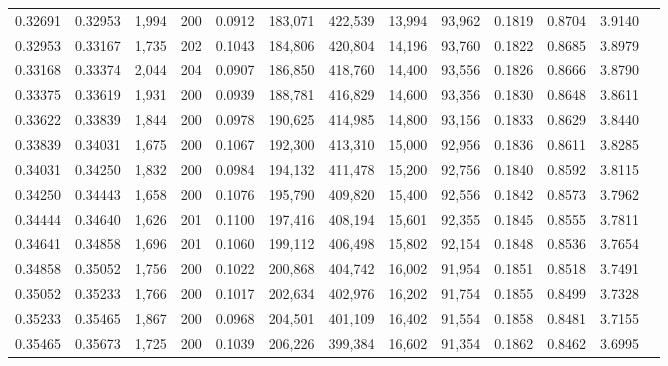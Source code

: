 \begin{tabular}{rrrrrrrrrrrrr}
0.32691 & 0.32953 & 1,994 & 200 &                                     0.0912 & 183,071 & 422,539 &  13,994 &  93,962 & 0.1819 & 0.8704 & 3.9140 \\
0.32953 & 0.33167 & 1,735 & 202 &                                     0.1043 & 184,806 & 420,804 &  14,196 &  93,760 & 0.1822 & 0.8685 & 3.8979 \\
0.33168 & 0.33374 & 2,044 & 204 &                                     0.0907 & 186,850 & 418,760 &  14,400 &  93,556 & 0.1826 & 0.8666 & 3.8790 \\
0.33375 & 0.33619 & 1,931 & 200 &                                     0.0939 & 188,781 & 416,829 &  14,600 &  93,356 & 0.1830 & 0.8648 & 3.8611 \\
0.33622 & 0.33839 & 1,844 & 200 &                                     0.0978 & 190,625 & 414,985 &  14,800 &  93,156 & 0.1833 & 0.8629 & 3.8440 \\
0.33839 & 0.34031 & 1,675 & 200 &                                     0.1067 & 192,300 & 413,310 &  15,000 &  92,956 & 0.1836 & 0.8611 & 3.8285 \\
0.34031 & 0.34250 & 1,832 & 200 &                                     0.0984 & 194,132 & 411,478 &  15,200 &  92,756 & 0.1840 & 0.8592 & 3.8115 \\
0.34250 & 0.34443 & 1,658 & 200 &                                     0.1076 & 195,790 & 409,820 &  15,400 &  92,556 & 0.1842 & 0.8573 & 3.7962 \\
0.34444 & 0.34640 & 1,626 & 201 &                                     0.1100 & 197,416 & 408,194 &  15,601 &  92,355 & 0.1845 & 0.8555 & 3.7811 \\
0.34641 & 0.34858 & 1,696 & 201 &                                     0.1060 & 199,112 & 406,498 &  15,802 &  92,154 & 0.1848 & 0.8536 & 3.7654 \\
0.34858 & 0.35052 & 1,756 & 200 &                                     0.1022 & 200,868 & 404,742 &  16,002 &  91,954 & 0.1851 & 0.8518 & 3.7491 \\
0.35052 & 0.35233 & 1,766 & 200 &                                     0.1017 & 202,634 & 402,976 &  16,202 &  91,754 & 0.1855 & 0.8499 & 3.7328 \\
0.35233 & 0.35465 & 1,867 & 200 &                                     0.0968 & 204,501 & 401,109 &  16,402 &  91,554 & 0.1858 & 0.8481 & 3.7155 \\
0.35465 & 0.35673 & 1,725 & 200 &                                     0.1039 & 206,226 & 399,384 &  16,602 &  91,354 & 0.1862 & 0.8462 & 3.6995 \\

\end{tabular}
